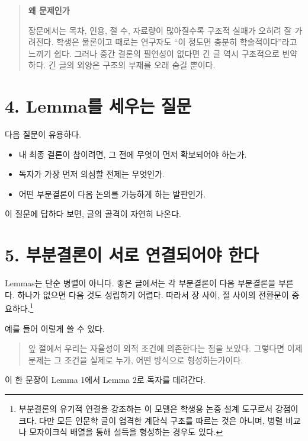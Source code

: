 \begin{quote}
\textbf{왜 문제인가}

장문에서는 목차, 인용, 절 수, 자료량이 많아질수록 구조적 실패가 오히려 잘 가려진다. 학생은 물론이고 때로는 연구자도 ``이 정도면 충분히 학술적이다''라고 느끼기 쉽다. 그러나 중간 결론의 필연성이 없다면 긴 글 역시 구조적으로 빈약하다. 긴 글의 외양은 구조의 부재를 오래 숨길 뿐이다.
\end{quote}

\section{4. Lemma를 세우는 질문}\label{4-lemmauxb97c-uxc138uxc6b0uxb294-uxc9c8uxbb38}

다음 질문이 유용하다.

\begin{itemize}
\tightlist
\item
  내 최종 결론이 참이려면, 그 전에 무엇이 먼저 확보되어야 하는가.
\item
  독자가 가장 먼저 의심할 전제는 무엇인가.
\item
  어떤 부분결론이 다음 논의를 가능하게 하는 발판인가.
\end{itemize}

이 질문에 답하다 보면, 글의 골격이 자연히 나온다.

\section{5. 부분결론이 서로 연결되어야 한다}\label{5-uxbd80uxbd84uxacb0uxb860uxc774-uxc11cuxb85c-uxc5f0uxacb0uxb418uxc5b4uxc57c-uxd55cuxb2e4}

Lemmas는 단순 병렬이 아니다. 좋은 글에서는 각 부분결론이 다음 부분결론을 부른다. 하나가 없으면 다음 것도 성립하기 어렵다. 따라서 장 사이, 절 사이의 전환문이 중요하다.\footnote{부분결론의 유기적 연결을 강조하는 이 모델은 학생용 논증 설계 도구로서 강점이 크다. 다만 모든 인문학 글이 엄격한 계단식 구조를 따르는 것은 아니며, 병렬 비교나 모자이크식 배열을 통해 설득을 형성하는 경우도 있다.}

예를 들어 이렇게 쓸 수 있다.

\begin{quote}
앞 절에서 우리는 자율성이 외적 조건에 의존한다는 점을 보았다. 그렇다면 이제 문제는 그 조건을 실제로 누가, 어떤 방식으로 형성하는가이다.
\end{quote}

이 한 문장이 Lemma 1에서 Lemma 2로 독자를 데려간다.

